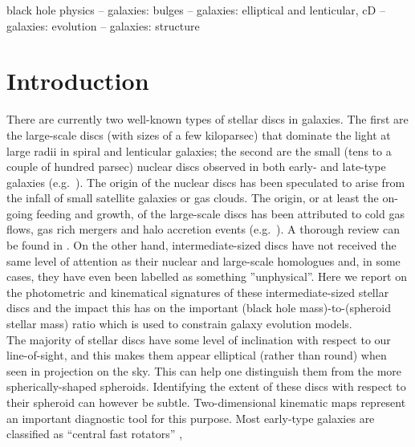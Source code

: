 \documentclass[useAMS,usenatbib,article]{mn2e}
\begin{document}
\begin{keywords}
black hole physics -- galaxies: bulges -- galaxies: elliptical and lenticular, cD -- galaxies: evolution -- galaxies: structure
\end{keywords}

\section{Introduction}
\label{sec:int}
There are currently two well-known types of stellar discs in galaxies. 
The first are the large-scale discs (with sizes of a few kiloparsec) 
that dominate the light at large radii in spiral and lenticular galaxies; 
the second are the small (tens to a couple of hundred parsec) nuclear discs observed in both early- and late-type galaxies 
(e.g.~\citealt{scorzavandenbosch1998,rest2001,balcells2007,ledo2010}). 
The origin of the nuclear discs has been speculated to arise from the infall of small satellite galaxies or gas clouds.  
The origin, or at least the on-going feeding and growth, of the large-scale discs has been attributed to cold gas flows, 
gas rich mergers and halo accretion events 
(e.g.~\citealt{khochfarsilk2006,dekel2009nat,ceverino2010,ceverino2012,conselice2012}). 
A thorough review can be found in \citet{combes2014arX,combes2014pro}.
On the other hand, intermediate-sized discs have not received the same level of attention 
as their nuclear and large-scale homologues and,  
in some cases, they have even been labelled as something ''unphysical''. 
Here we report on the photometric and kinematical signatures of these intermediate-sized stellar discs 
and the impact this has on the important (black hole mass)-to-(spheroid stellar mass) ratio %
which is used to constrain galaxy evolution models. \\
The majority of stellar discs have some level of inclination with respect to our line-of-sight, 
and this makes them appear elliptical (rather than round) when seen in projection on the sky. 
This can help one distinguish them from the more spherically-shaped spheroids. 
Identifying the extent of these discs with respect to their spheroid can however be subtle. 
Two-dimensional kinematic maps represent an important diagnostic tool for this purpose. 
Most early-type galaxies are classified as ``central fast rotators'' \citep{atlas3dIII-MNRAS}, 
\end{document}

